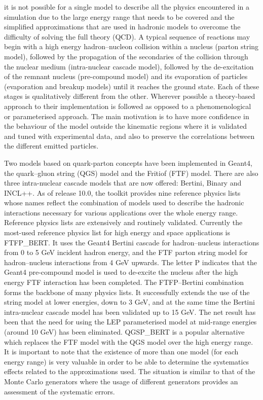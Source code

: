 \documentclass[12pt,a4paper]{article}
\begin{document}
it is not possible for a single model to describe all the physics
encountered in a simulation due to the large energy range that needs to
be covered and the simplified approximations that are used in hadronic
models to overcome the difficulty of solving the full theory (QCD). A
typical sequence of reactions may begin with a high energy
hadron--nucleon collision within a nucleus (parton string model),
followed by the propagation of the secondaries of the collision through
the nuclear medium (intra-nuclear cascade model), followed by the
de-excitation of the remnant nucleus (pre-compound model) and its
evaporation of particles (evaporation and breakup models) until it
reaches the ground state. Each of these stages is qualitatively
different from the other. Wherever possible a theory-based approach to
their implementation is followed as opposed to a phenomenological or
parameterised approach. The main motivation is to have more confidence
in the behaviour of the model outside the kinematic regions where it is
validated and tuned with experimental data, and also to preserve the
correlations between the different emitted particles.

Two models based on quark-parton concepts have been implemented in
Geant4, the quark--gluon string (QGS) model and the Fritiof (FTF) model.
There are also three intra-nuclear cascade models that are now offered:
Bertini, Binary and INCL++. As of release 10.0, the toolkit provides
nine reference physics lists whose names reflect the combination of
models used to describe the hadronic interactions necessary for various
applications over the whole energy range. Reference physics lists are
extensively and routinely validated. Currently the most-used reference
physics list for high energy and space applications is FTFP\_BERT. It
uses the Geant4 Bertini cascade for hadron--nucleus interactions from 0
to 5 GeV incident hadron energy, and the FTF parton string model for
hadron--nucleus interactions from 4 GeV upwards. The letter P indicates
that the Geant4 pre-compound model is used to de-excite the nucleus
after the high energy FTF interaction has been completed. The
FTFP--Bertini combination forms the backbone of many physics lists. It
successfully extends the use of the string model at lower energies, down
to 3 GeV, and at the same time the Bertini intra-nuclear cascade model
has been validated up to 15 GeV. The net result has been that the need
for using the LEP parameterised model at mid-range energies (around 10
GeV) has been eliminated. QGSP\_BERT is a popular alternative which
replaces the FTF model with the QGS model over the high energy range. It
is important to note that the existence of more than one model (for each
energy range) is very valuable in order to be able to determine the
systematics effects related to the approximations used. The situation is
similar to that of the Monte Carlo generators where the usage of
different generators provides an assessment of the systematic errors.
\end{document}
